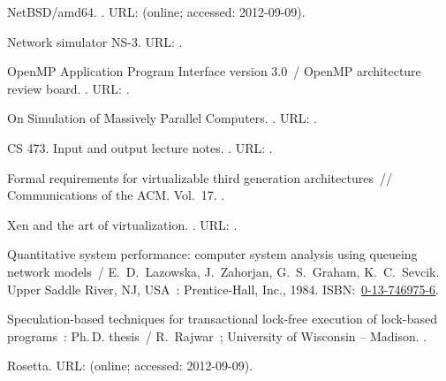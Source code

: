\begin{thebibliography}{10}
{NetBSD}/{amd64}. \BibDash
{}. \BibDash
\newblock URL:  (online; accessed:
  2012-09-09).

{Network simulator {NS-3}}. \BibDash
\newblock URL: .

{{OpenMP} Application Program Interface version 3.0}~/ {OpenMP} architecture
  review board. \BibDash
{}. \BibDash
\newblock URL: .

 {On
  Simulation of Massively Parallel Computers}. \BibDash
{}. \BibDash
\newblock URL:
  .

 {CS 473}. Input and output lecture notes. \BibDash
{}. \BibDash
\newblock URL:
  .

 {Formal requirements for virtualizable
  third generation architectures}~// {Communications of the {{ACM}}}. \BibDash
\newblock Vol.~17. \BibDash
{}.

 {Xen and the art of virtualization}. \BibDash
{}. \BibDash
\newblock URL: .

{Quantitative system performance: computer system analysis using queueing
  network models}~/ E.~D.~Lazowska, J.~Zahorjan, G.~S.~Graham, K.~C.~Sevcik.
  \BibDash
\newblock Upper Saddle River, NJ, USA~: Prentice-Hall, Inc., 1984. \BibDash
\newblock
  ISBN:~\href{http://isbndb.com/search-all.html?kw=0-13-746975-6}{0-13-746975-6}.

 {Speculation-based techniques for transactional lock-free
  execution of lock-based programs}~: Ph.\,D. thesis~/ R.~Rajwar~; University
  of Wisconsin – Madison. \BibDash
{}.

Rosetta. \BibDash
\newblock URL:  (online; accessed:
  2012-09-09).


\end{thebibliography}
